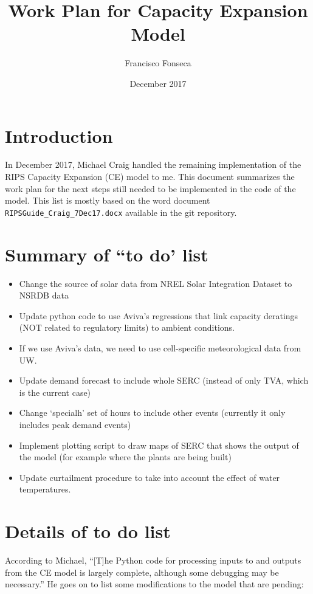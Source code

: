 \documentclass[11pt, oneside]{article}   	%
\title{Work Plan for Capacity Expansion Model}
\author{Francisco Fonseca}
\date{December 2017}							%
\begin{document}
\maketitle

\section{Introduction}

In December 2017, Michael Craig handled the remaining implementation of the RIPS Capacity Expansion (CE) model to me. This document summarizes the work plan for the next steps still needed to be implemented in the code of the model. This list is mostly based on the word document \texttt{RIPSGuide\_Craig\_7Dec17.docx} available in the git repository.

\section{Summary of ``to do' list}

\begin{itemize}
\item Change the source of solar data from NREL Solar Integration Dataset to NSRDB data
\item Update python code to use Aviva's regressions that link capacity deratings (NOT related to regulatory limits) to ambient conditions.
\item If we use Aviva's data, we need to use cell-specific meteorological data from UW.
\item Update demand forecast to include whole SERC (instead of only TVA, which is the current case)
\item Change `specialh' set of hours to include other events (currently it only includes peak demand events)
\item Implement plotting script to draw maps of SERC that shows the output of the model (for example where the plants are being built)
\item Update curtailment procedure to take into account the effect of water temperatures.
\end{itemize}


\section{Details of to do list}

According to Michael, ``[T]he Python code for processing inputs to and outputs from the CE model is largely complete, although some debugging may be necessary.'' He goes on to list some modifications to the model that are pending:
\end{document}
